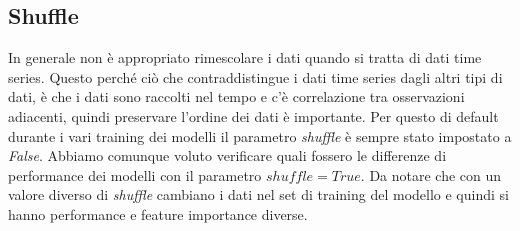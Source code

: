 \subsection{Shuffle}
In generale non \`e appropriato rimescolare i dati quando si tratta di dati time series. Questo perch\'e ci\`o che contraddistingue i dati time series dagli altri tipi di dati, \`e che i dati sono raccolti nel tempo e c'\`e correlazione tra osservazioni adiacenti, quindi preservare l'ordine dei dati \`e importante. Per questo di default durante i vari training dei modelli il parametro \textit{shuffle} \`e sempre stato impostato a \textit{False}. Abbiamo comunque voluto verificare quali fossero le differenze di performance dei modelli con il parametro $shuffle=True$. Da notare che con un valore diverso di \textit{shuffle} cambiano i dati nel set di training del modello e quindi si hanno performance e feature importance diverse.

 \vspace{-0.5cm}
 \vspace{-0.3cm}